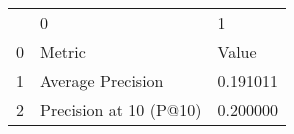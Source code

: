 \begin{tabular}{lll}
 & 0 & 1 \\
0 & Metric & Value \\
1 & Average Precision & 0.191011 \\
2 & Precision at 10 (P@10) & 0.200000 \\
\end{tabular}
